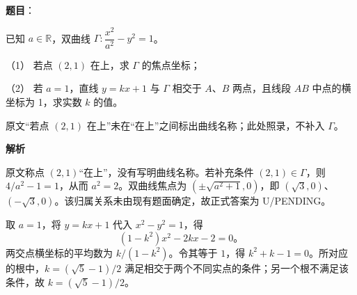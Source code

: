 \begin{answer}

\textbf{题目}：

已知 $a\in\mathbb R$，双曲线 $\Gamma:\dfrac{x^2}{a^2}-y^2=1$。

（1） 若点 $(2,1)$ 在上，求 $\Gamma$ 的焦点坐标；

（2） 若 $a=1$，直线 $y=kx+1$ 与 $\Gamma$ 相交于 $A\text{、}B$ 两点，且线段 $AB$ 中点的横坐标为 1，求实数 $k$ 的值。

\begin{gktip}
原文“若点 $(2,1)$ 在上”未在“在上”之间标出曲线名称；此处照录，不补入 $\Gamma$。
\end{gktip}

\textbf{解析}


原文称点 $(2,1)$“在上”，没有写明曲线名称。若补充条件 $(2,1)\in\Gamma$，则 $4/a^2-1=1$，从而 $a^2=2$。双曲线焦点为 $(\pm\sqrt{a^2+1},0)$，即 $(\sqrt3,0)$、$(-\sqrt3,0)$。该归属关系未由现有题面确定，故正式答案为 U/PENDING。


取 $a=1$，将 $y=kx+1$ 代入 $x^2-y^2=1$，得
\nopagebreak[4]
\[
(1-k^2)x^2-2kx-2=0\text{。}
\]
两交点横坐标的平均数为 $k/(1-k^2)$。令其等于 $1$，得 $k^2+k-1=0$。所对应的根中，$k=(\sqrt5-1)/2$ 满足相交于两个不同实点的条件；另一个根不满足该条件，故 $k=(\sqrt5-1)/2$。



\end{answer}
